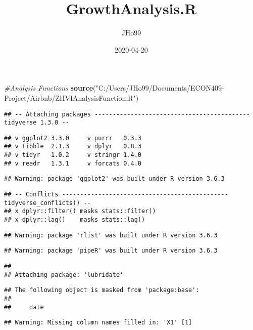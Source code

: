 \documentclass[
]{article}
\title{GrowthAnalysis.R}
\author{JHo99}
\date{2020-04-20}
\newenvironment{Shaded}{\begin{snugshade}}{\end{snugshade}}
\newcommand{\CommentTok}[1]{\textcolor[rgb]{0.56,0.35,0.01}{\textit{#1}}}
\newcommand{\KeywordTok}[1]{\textcolor[rgb]{0.13,0.29,0.53}{\textbf{#1}}}
\newcommand{\NormalTok}[1]{#1}
\newcommand{\StringTok}[1]{\textcolor[rgb]{0.31,0.60,0.02}{#1}}
\begin{document}
\maketitle

\begin{Shaded}
\begin{Highlighting}[]
\CommentTok{#Analysis Functions}
\KeywordTok{source}\NormalTok{(}\StringTok{"C:/Users/JHo99/Documents/ECON409-Project/Airbnb/ZHVIAnalysisFunction.R"}\NormalTok{)}
\end{Highlighting}
\end{Shaded}

\begin{verbatim}
## -- Attaching packages ------------------------------------------- tidyverse 1.3.0 --
\end{verbatim}

\begin{verbatim}
## v ggplot2 3.3.0     v purrr   0.3.3
## v tibble  2.1.3     v dplyr   0.8.3
## v tidyr   1.0.2     v stringr 1.4.0
## v readr   1.3.1     v forcats 0.4.0
\end{verbatim}

\begin{verbatim}
## Warning: package 'ggplot2' was built under R version 3.6.3
\end{verbatim}

\begin{verbatim}
## -- Conflicts ---------------------------------------------- tidyverse_conflicts() --
## x dplyr::filter() masks stats::filter()
## x dplyr::lag()    masks stats::lag()
\end{verbatim}

\begin{verbatim}
## Warning: package 'rlist' was built under R version 3.6.3
\end{verbatim}

\begin{verbatim}
## Warning: package 'pipeR' was built under R version 3.6.3
\end{verbatim}

\begin{verbatim}
## 
## Attaching package: 'lubridate'
\end{verbatim}

\begin{verbatim}
## The following object is masked from 'package:base':
## 
##     date
\end{verbatim}

\begin{verbatim}
## Warning: Missing column names filled in: 'X1' [1]
\end{verbatim}
\end{document}
